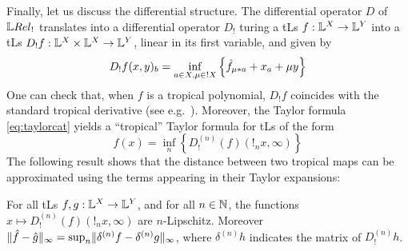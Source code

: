 Finally, let us discuss the differential structure. The differential operator $D$ of $\LREL_{!}$ translates into a differential operator $D_{!}$ turing a tLs $f:\mathbb{L}^{X}\to \mathbb{L}^{Y}$ into a tLs $D_{!}f:\mathbb{L}^{X}\times \mathbb{L}^{X}\to \mathbb{L}^{Y}$, linear in its first variable, and given by 
\begin{equation}
D_{!}f(x,y)_{b}=\inf_{a\in X, \mu\in !X}\left\{\hat{f}_{\mu*a}+x_{a}+\mu y\right\}
\end{equation}
One can check that, when $f$ is a tropical polynomial, $D_{!}f$ coincides with the standard tropical derivative (see e.g.~\cite{Grigoriev2017}).
Moreover, the Taylor formula \eqref{eq:taylorcat} yields a ``tropical'' Taylor formula for tLs of the form 
\begin{equation}
f(x)=\inf_{n}\left\{D_{!}^{(n)}(f)(!_{n}x,\infty)\right\}
\end{equation}
The following result shows that the distance between two tropical maps can be approximated using the terms appearing in their Taylor expansions:
\begin{proposition}
For all tLs $f,g: \mathbb{L}^{X}\to \mathbb{L}^{Y}$, and for all $n\in \mathbb{N}$, 
the functions $x\mapsto D_{!}^{(n)}(f)(!_{n}x,\infty)$ are $n$-Lipschitz. Moreover 
$\lVert \hat{f}-\hat{g}\rVert_{\infty}= \sup_{n} \lVert {\delta^{(n)}f}- {\delta^{(n)}g}\rVert_{\infty}$, 
where $\delta^{(n)}h$ indicates the matrix of $D_{!}^{(n)}h$.
\end{proposition} 


